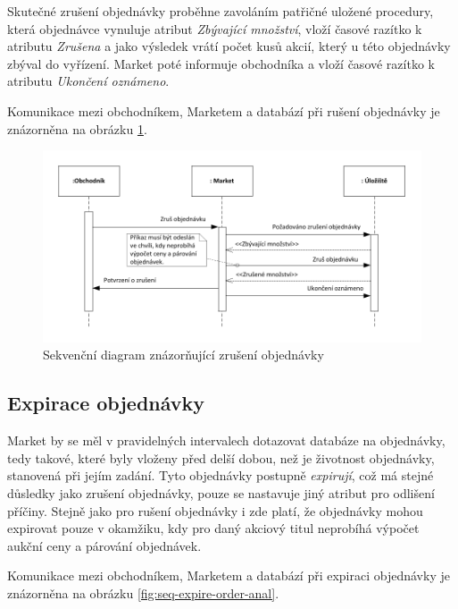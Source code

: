 \documentclass[thesis=M,czech]{FITthesis}[2012/06/26]
\begin{document}
Skutečné zrušení objednávky proběhne zavoláním patřičné uložené procedury, která objednávce vynuluje atribut \textit{Zbývající množství}, 
vloží časové razítko k atributu \textit{Zrušena} a jako výsledek vrátí počet kusů akcií, který u této objednávky zbýval do vyřízení. 
Market poté informuje obchodníka a vloží časové razítko k atributu \textit{Ukončení oznámeno}.

Komunikace mezi obchodníkem, Marketem a databází při rušení objednávky je znázorněna na obrázku \ref{fig:seq-cancel-order-anal}.

\begin{figure}\centering
	\includegraphics[width=\textwidth]{images/seq-cancel-order-anal} 
	\caption[Diagram zrušení objednávky]{Sekvenční diagram znázorňující zrušení objednávky}\label{fig:seq-cancel-order-anal}
\end{figure}


\subsection{Expirace objednávky}

Market by se měl v pravidelných intervalech dotazovat databáze na  objednávky, tedy takové, které byly vloženy před delší dobou,
než je životnost objednávky, stanovená při jejím zadání. 
Tyto objednávky postupně \textit{expirují}, což má stejné důsledky jako zrušení objednávky, pouze se nastavuje jiný atribut pro odlišení příčiny. 
Stejně jako pro rušení objednávky i zde platí, že objednávky mohou expirovat pouze v okamžiku, kdy pro daný akciový titul neprobíhá výpočet 
aukční ceny a párování objednávek.

Komunikace mezi obchodníkem, Marketem a databází při expiraci objednávky je znázorněna na obrázku \ref{fig:seq-expire-order-anal}.
\end{document}
